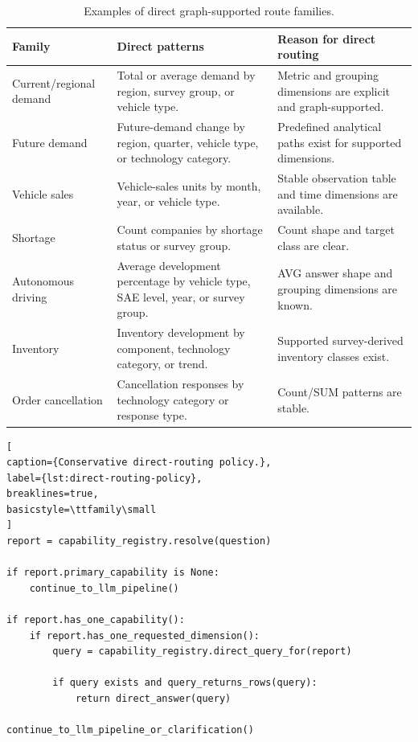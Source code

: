 \documentclass[
  12pt,
  english,
  oneside]{report}
\begin{document}
\begin{table}[htbp]
\centering
\caption{Examples of direct graph-supported route families.}
\label{tab:direct-route-families}
\small
\begin{tabularx}{\textwidth}{
>{\raggedright\arraybackslash}p{3.2cm}
>{\raggedright\arraybackslash}p{5.0cm}
>{\raggedright\arraybackslash}X
}
\toprule
\textbf{Family} & \textbf{Direct patterns} & \textbf{Reason for direct routing} \\
\midrule
Current/regional demand & Total or average demand by region, survey group, or vehicle type. & Metric and grouping dimensions are explicit and graph-supported. \\
Future demand & Future-demand change by region, quarter, vehicle type, or technology category. & Predefined analytical paths exist for supported dimensions. \\
Vehicle sales & Vehicle-sales units by month, year, or vehicle type. & Stable observation table and time dimensions are available. \\
Shortage & Count companies by shortage status or survey group. & Count shape and target class are clear. \\
Autonomous driving & Average development percentage by vehicle type, SAE level, year, or survey group. & AVG answer shape and grouping dimensions are known. \\
Inventory & Inventory development by component, technology category, or trend. & Supported survey-derived inventory classes exist. \\
Order cancellation & Cancellation responses by technology category or response type. & Count/SUM patterns are stable. \\
\bottomrule
\end{tabularx}
\end{table}

\begin{lstlisting}[
caption={Conservative direct-routing policy.},
label={lst:direct-routing-policy},
breaklines=true,
basicstyle=\ttfamily\small
]
report = capability_registry.resolve(question)

if report.primary_capability is None:
    continue_to_llm_pipeline()

if report.has_one_capability():
    if report.has_one_requested_dimension():
        query = capability_registry.direct_query_for(report)

        if query exists and query_returns_rows(query):
            return direct_answer(query)

continue_to_llm_pipeline_or_clarification()
\end{lstlisting}
\end{document}
